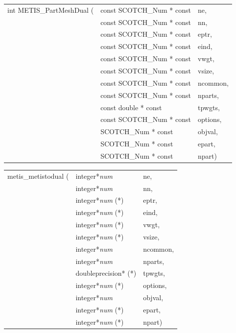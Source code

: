\begin{itemize}
\progsyn

{\tt\begin{tabular}{l@{}ll}
int METIS\_PartMeshDual ( & const SCOTCH\_Num * const & ne,      \\
                          & const SCOTCH\_Num * const & nn,      \\
                          & const SCOTCH\_Num * const & eptr,    \\
                          & const SCOTCH\_Num * const & eind,    \\
                          & const SCOTCH\_Num * const & vwgt,    \\
                          & const SCOTCH\_Num * const & vsize,   \\
                          & const SCOTCH\_Num * const & ncommon, \\
                          & const SCOTCH\_Num * const & nparts,  \\
                          & const double * const      & tpwgts,  \\
                          & const SCOTCH\_Num * const & options, \\
                          & SCOTCH\_Num * const       & objval,  \\
                          & SCOTCH\_Num * const       & epart,   \\
                          & SCOTCH\_Num * const       & npart)
\end{tabular}}

{\tt\begin{tabular}{l@{}ll}
metis\_metistodual ( & integer*{\it num}     & ne,      \\
                     & integer*{\it num}     & nn,      \\
                     & integer*{\it num} (*) & eptr,    \\
                     & integer*{\it num} (*) & eind,    \\
                     & integer*{\it num} (*) & vwgt,    \\
                     & integer*{\it num} (*) & vsize,   \\
                     & integer*{\it num}     & ncommon, \\
                     & integer*{\it num}     & nparts,  \\
                     & doubleprecision* (*)  & tpwgts,  \\
                     & integer*{\it num} (*) & options, \\
                     & integer*{\it num}     & objval,  \\
                     & integer*{\it num} (*) & epart,   \\
                     & integer*{\it num} (*) & npart)
\end{tabular}}


\end{itemize}
